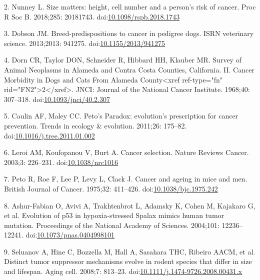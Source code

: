 \documentclass[]{elsarticle} %
\begin{document}
\leavevmode\hypertarget{ref-Nunney:20181c2}{}%
2. Nunney L. Size matters: height, cell number and a person's risk of
cancer. Proc R Soc B. 2018;285: 20181743.
doi:\href{https://doi.org/10.1098/rspb.2018.1743}{10.1098/rspb.2018.1743}

\leavevmode\hypertarget{ref-Dobson2013}{}%
3. Dobson JM. Breed-predispositions to cancer in pedigree dogs. ISRN
veterinary science. 2013;2013: 941275.
doi:\href{https://doi.org/10.1155/2013/941275}{10.1155/2013/941275}

\leavevmode\hypertarget{ref-Dorn1968}{}%
4. Dorn CR, Taylor DON, Schneider R, Hibbard HH, Klauber MR. Survey of
Animal Neoplasms in Alameda and Contra Costa Counties, California. II.
Cancer Morbidity in Dogs and Cats From Alameda County\textless{}xref
ref-type="fn" rid="FN2"\textgreater{}2\textless{}/xref\textgreater{}.
JNCI: Journal of the National Cancer Institute. 1968;40: 307--318.
doi:\href{https://doi.org/10.1093/jnci/40.2.307}{10.1093/jnci/40.2.307}

\leavevmode\hypertarget{ref-Caulin2011}{}%
5. Caulin AF, Maley CC. Peto's Paradox: evolution's prescription for
cancer prevention. Trends in ecology \& evolution. 2011;26: 175--82.
doi:\href{https://doi.org/10.1016/j.tree.2011.01.002}{10.1016/j.tree.2011.01.002}

\leavevmode\hypertarget{ref-Leroi2003}{}%
6. Leroi AM, Koufopanou V, Burt A. Cancer selection. Nature Reviews
Cancer. 2003;3: 226--231.
doi:\href{https://doi.org/10.1038/nrc1016}{10.1038/nrc1016}

\leavevmode\hypertarget{ref-Peto1975}{}%
7. Peto R, Roe F, Lee P, Levy L, Clack J. Cancer and ageing in mice and
men. British Journal of Cancer. 1975;32: 411--426.
doi:\href{https://doi.org/10.1038/bjc.1975.242}{10.1038/bjc.1975.242}

\leavevmode\hypertarget{ref-Ashur-Fabian2004}{}%
8. Ashur-Fabian O, Avivi A, Trakhtenbrot L, Adamsky K, Cohen M, Kajakaro
G, et al. Evolution of p53 in hypoxia-stressed Spalax mimics human tumor
mutation. Proceedings of the National Academy of Sciences. 2004;101:
12236--12241.
doi:\href{https://doi.org/10.1073/pnas.0404998101}{10.1073/pnas.0404998101}

\leavevmode\hypertarget{ref-Seluanov2008}{}%
9. Seluanov A, Hine C, Bozzella M, Hall A, Sasahara THC, Ribeiro AACM,
et al. Distinct tumor suppressor mechanisms evolve in rodent species
that differ in size and lifespan. Aging cell. 2008;7: 813--23.
doi:\href{https://doi.org/10.1111/j.1474-9726.2008.00431.x}{10.1111/j.1474-9726.2008.00431.x}
\end{document}
